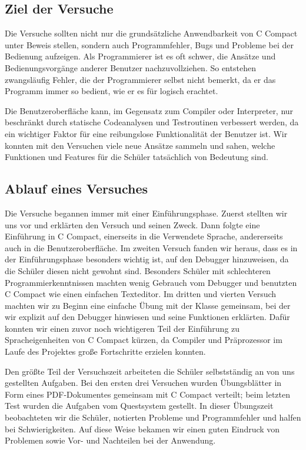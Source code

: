 \subsection{Ziel der Versuche}
Die Versuche sollten nicht nur die grundsätzliche Anwendbarkeit von C Compact unter Beweis stellen, sondern auch Programmfehler, Bugs und Probleme bei der Bedienung aufzeigen. Als Programmierer ist es oft schwer, die Ansätze und Bedienungsvorgänge anderer Benutzer nachzuvollziehen. So entstehen zwangsläufig Fehler, die der Programmierer selbst nicht bemerkt, da er das Programm immer so bedient, wie er es für logisch erachtet.

Die Benutzeroberfläche kann, im Gegensatz zum Compiler oder Interpreter, nur beschränkt durch statische Codeanalysen und Testroutinen verbessert werden, da ein wichtiger Faktor für eine reibungslose Funktionalität der Benutzer ist. Wir konnten mit den Versuchen viele neue Ansätze sammeln und sahen, welche Funktionen und Features für die Schüler tatsächlich von Bedeutung sind.

\subsection{Ablauf eines Versuches}
Die Versuche begannen immer mit einer Einführungsphase. Zuerst stellten wir uns vor und erklärten den Versuch und seinen Zweck. Dann folgte eine Einführung in C Compact, einerseits in die Verwendete Sprache, andererseits auch in die Benutzeroberfläche. Im zweiten Versuch fanden wir heraus, dass es in der Einführungsphase besonders wichtig ist, auf den Debugger hinzuweisen, da die Schüler diesen nicht gewohnt sind. Besonders Schüler mit schlechteren Programmierkenntnissen machten wenig Gebrauch vom Debugger und benutzten C Compact wie einen einfachen Texteditor. Im dritten und vierten Versuch machten wir zu Beginn eine einfache Übung mit der Klasse gemeinsam, bei der wir explizit auf den Debugger hinwiesen und seine Funktionen erklärten. Dafür konnten wir einen zuvor noch wichtigeren Teil der Einführung zu Spracheigenheiten von C Compact kürzen, da Compiler und Präprozessor im Laufe des Projektes große Fortschritte erzielen konnten.

Den größte Teil der Versuchszeit arbeiteten die Schüler selbstständig an von uns gestellten Aufgaben. Bei den ersten drei Versuchen wurden Übungsblätter in Form eines PDF-Dokumentes gemeinsam mit C Compact verteilt; beim letzten Test wurden die Aufgaben vom Questsystem gestellt. In dieser Übungszeit beobachteten wir die Schüler, notierten Probleme und Programmfehler und halfen bei Schwierigkeiten. Auf diese Weise bekamen wir einen guten Eindruck von Problemen sowie Vor- und Nachteilen bei der Anwendung.

